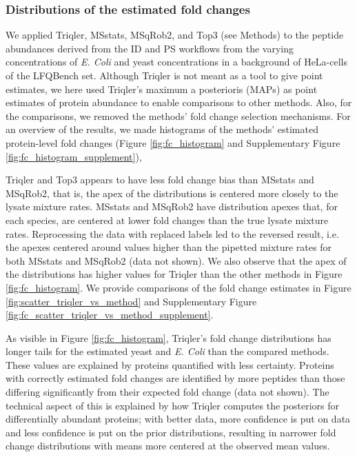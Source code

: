 \documentclass[10pt,letterpaper]{article}
\begin{document}
\subsubsection*{Distributions of the estimated fold changes}

We applied Triqler, MSstats, MSqRob2, and Top3 (see Methods) to the peptide abundances derived from the ID and PS workflows from the varying concentrations of {\em E. Coli} and yeast concentrations in a background of HeLa-cells of the LFQBench set. Although Triqler is not meant as a tool to give point estimates, we here used Triqler's maximum a posterioris (MAPs) as point estimates of protein abundance to enable comparisons to other methods. Also, for the comparisons, we removed the methods' fold change selection mechanisms. For an overview of the results, we made histograms of the methods' estimated protein-level fold changes (Figure \ref{fig:fc_histogram} and Supplementary Figure \ref{fig:fc_histogram_supplement}), 

Triqler and Top3 appears to have less fold change bias than MSstats and MSqRob2, that is, the apex of the distributions is centered more closely to the lysate mixture rates. MSstats and MSqRob2 have distribution apexes that, for each species, are centered at lower fold changes than the true lysate mixture rates. Reprocessing the data with replaced labels led to the reversed result, i.e. the apexes centered around values higher than the pipetted mixture rates for both MSstats and MSqRob2 (data not shown). We also observe that the apex of the distributions has higher values for Triqler than the other methods in Figure \ref{fig:fc_histogram}. We provide comparisons of the fold change estimates in Figure \ref{fig:scatter_triqler_vs_method} and Supplementary Figure \ref{fig:fc_scatter_triqler_vs_method_supplement}.


As visible in Figure \ref{fig:fc_histogram}, Triqler's fold change distributions has longer tails for the estimated yeast and {\em E. Coli} than the compared methods. These values are explained by proteins quantified with less certainty. Proteins with correctly estimated fold changes are identified by more peptides than those differing significantly from their expected fold change (data not shown). The technical aspect of this is explained by how Triqler computes the posteriors for differentially abundant proteins; with better data, more confidence is put on data and less confidence is put on the prior distributions, resulting in narrower fold change distributions with means more centered at the observed mean values. 
\end{document}
